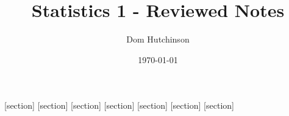 \documentclass[11pt,a4paper]{article}
\begin{document}
\pagestyle{fancy}
\setlength\parindent{0pt}
\allowdisplaybreaks

[section]
[section]
[section]
[section]
[section]
[section]
[section]


\newcommand{\eg}{\textit{e.g.} }
\newcommand{\EG}{\underline{E.G.} - }
\newcommand{\ie}{\textit{i.e.} }
\newcommand{\IE}{\underline{I.E.} - }
\newcommand{\NB}{\underline{N.B.} - }
\newcommand{\expect}{\mathbb{E}}
\newcommand{\prob}{\mathbb{P}}
\newcommand{\argmax}{\mathrm{argmax}}
\newcommand{\argmin}{\mathrm{argmin}}
\newcommand{\var}{\mathrm{Var}}
\newcommand\doubleplus{+\kern-1.3ex+\kern0.8ex} %

\newcommand{\definition}[1]{\stepcounter{definition} \textbf{Definition \arabic{section}.\arabic{definition}\ - }\textit{#1}\\}
\newcommand{\Definition}[1]{\stepcounter{definition} \textbf{Definition \arabic{section}.\arabic{definition}\ - }\textit{#1}}
\newcommand{\notation}[1]{\stepcounter{notation} \textbf{Notation \arabic{section}.\arabic{notation}\ - }\textit{#1}\\}
\newcommand{\proof}[1]{\stepcounter{proof} \textbf{Proof \arabic{section}.\arabic{proof}\ - }\textit{#1}\\}
\newcommand{\proposition}[1]{\stepcounter{proposition} \textbf{Proposition \arabic{section}.\arabic{proposition}\ - }\textit{#1}\\}
\newcommand{\Proposition}[1]{\stepcounter{proposition} \textbf{Proposition \arabic{section}.\arabic{proposition}\ - }\textit{#1}}
\newcommand{\theorem}[1]{\stepcounter{theorem} \textbf{Theorem \arabic{section}.\arabic{theorem} - }\textit{#1}\\}

\renewcommand{\headrulewidth}{0pt}

\title{Statistics 1 - Reviewed Notes}
\author{Dom Hutchinson}
\date{\today}
\maketitle

\fancyhead[R]{\today}

\tableofcontents
\newpage
\end{document}
